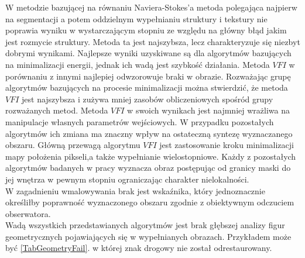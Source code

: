 \documentclass[a4paper,12pt,twoside,openany]{report}
\begin{document}
W metodzie bazującej na równaniu Naviera-Stokes'a metoda polegająca najpierw na segmentacji a potem oddzielnym wypełnianiu struktury i tekstury nie poprawia wyniku w wystarczającym stopniu ze względu na główny błąd jakim jest rozmycie struktury. Metoda ta jest najszybsza, lecz charakteryzuje się niezbyt dobrymi wynikami. Najlepsze wyniki uzyskiwane są dla algorytmów bazujących na minimalizacji energii, jednak ich wadą jest szybkość działania. Metoda $VFI$ w porównaniu z innymi najlepiej odwzorowuje braki w obrazie. Rozważając grupę algorytmów bazujących na procesie minimalizacji można stwierdzić, że metoda $VFI$ jest najszybsza i zużywa mniej zasobów obliczeniowych spośród grupy rozważanych metod. Metoda $VFI$ w swoich wynikach jest najmniej wrażliwa na manipulacje własnych parametrów wejściowych. W przypadku pozostałych algorytmów ich zmiana ma znaczny wpływ na ostateczną syntezę wyznaczanego obszaru. Główną przewagą algorytmu $VFI$ jest zastosowanie kroku minimalizacji mapy położenia pikseli,a także wypełnianie wielostopniowe. Każdy z pozostałych algorytmów badanych w pracy wyznacza obraz postępując od granicy maski do jej wnętrza w pewnym stopniu ograniczając charakter nielokalności.\\
W zagadnieniu wmalowywania brak jest wskaźnika, który jednoznacznie określiłby poprawność wyznaczonego obszaru zgodnie z obiektywnym odczuciem obserwatora.\\
Wadą wszystkich przedstawianych algorytmów jest brak głębszej analizy figur geometrycznych pojawiających się w wypełnianych obrazach. Przykładem może być \autoref{TabGeometryFail}. w której znak drogowy nie został odrestaurowany.

\newpage
{}



\newpage
{}
\listoffigures


\newpage
{}
\listoftables

\end{document}
